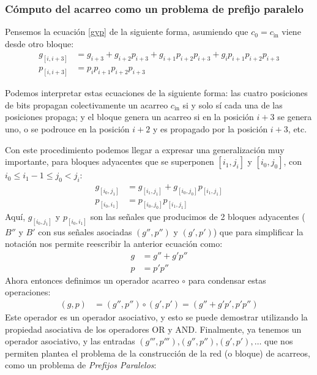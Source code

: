 \subsubsection{Cómputo del acarreo como un problema de prefijo paralelo}
Pensemos la ecuación \ref{gyp} de la siguiente forma, asumiendo que $c_0=c_\text{in}$ viene desde otro bloque:
\begin{equation}
\begin{align}
g_{[i,i+3]} &= g_{i+3}+g_{i+2}p_{i+3}+g_{i+1}p_{i+2}p_{i+3}+g_{i}p_{i+1}p_{i+2}p_{i+3}\nonumber\\
p_{[i,i+3]} &= p_{i}p_{i+1}p_{i+2}p_{i+3}\nonumber
\end{align}
\end{equation}

Podemos interpretar estas ecuaciones de la siguiente forma: las cuatro posiciones de bits propagan colectivamente un acarreo $c_\text{in}$ si y solo sí cada una de las posiciones propaga; y el bloque genera un acarreo si en la posición $i+3$ se genera uno, o se podrouce en la posición $i+2$ y es propagado por la posición $i+3$, etc.

Con este procedimiento podemos llegar a expresar una generalización muy importante, para bloques adyacentes que se superponen $[i_1,j_i]$ y $[i_0,j_0]$, con $i_0 \leq i_1 - 1 \leq j_0 < j_i $:
\begin{equation}
\begin{align}
g_{[i_0,j_1]} &= g_{[i_1,j_1]}+g_{[i_0,j_0]}p_{[i_1,j_1]} \nonumber\\
p_{[i_0,i_1]} &= p_{[i_0,j_0]}p_{[i_1,j_1]}\nonumber
\end{align}
\end{equation}
Aquí, $g_{[i_0,j_1]}$ y $p_{[i_0,i_1]}$ son las señales que producimos de 2 bloques adyacentes ($B''$ y $B'$ con sus señales asociadas $(g'',p'')$ y $(g',p')$) que para simplificar la notación nos permite reescribir la anterior ecuación como:
\begin{equation}
\begin{align}
g &= g'' + g'p''\nonumber\\
p &= p'p''\nonumber
\end{align}
\end{equation}
Ahora entonces definimos un operador acarreo $\circ$ para condensar estas operaciones:
\begin{equation}
\begin{align}
(g,p) &= (g'',p'') \circ (g',p') = (g'' + g'p', p'p'')\nonumber
\end{align}
\end{equation}
Este operador es un operador asociativo, y esto se puede demostrar utilizando la propiedad asociativa de los operadores OR y AND. Finalmente, ya tenemos un operador asociativo, y las entradas $(g''',p''')$,$(g'',p'')$,$(g',p'),\ldots$ que nos permiten plantea el problema de la construcción de la red (o bloque) de acarreos, como un problema de \emph{Prefijos Paralelos}:

